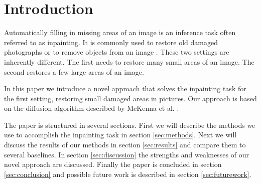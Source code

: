\section{Introduction}
\label{sec:introduction}

Automatically filling in missing areas of an image is an inference task often referred to as inpainting. It is commonly used to restore old damaged photographs or to remove objects from an image \cite{bertalmio2000image}. These two settings are inherently different. The first needs to restore many small areas of an image. The second restores a few large areas of an image.

In this paper we introduce a novel approach that solves the inpainting task for the first setting, restoring small damaged areas in pictures. Our approach is based on the diffusion algorithm described by McKenna et al. \cite{richard2001fast}.

The paper is structured in several sections. First we will describe the methods we use to accomplish the inpainting task in section \ref{sec:methods}. Next we will discuss the results of our methods in section \ref{sec:results} and compare them to several baselines. In section \ref{sec:discussion} the strengths and weaknesses of our novel approach are discussed. Finally the paper is concluded in section \ref{sec:conclusion} and possible future work is described in section \ref{sec:futurework}.
